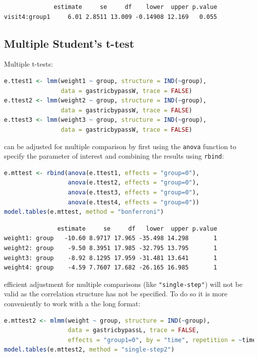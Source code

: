 \documentclass[12pt]{article}
\newcommand\Warning[1][3ex]{%
\renewcommand\stacktype{L}%
\scaleto{\stackon[1.3pt]{\color{red}$\triangle$}{\tiny\bfseries !}}{#1}%
\xspace
}
\begin{document}
\label{}
\begin{verbatim}
              estimate     se     df    lower  upper p.value
visit4:group1     6.01 2.8511 13.009 -0.14908 12.169   0.055
\end{verbatim}


\clearpage
\subsection{Multiple Student's t-test}
\label{sec:orge16a4e0}


Multiple t-tests:
\begin{lstlisting}[language=r,numbers=none]
e.ttest1 <- lmm(weight1 ~ group, structure = IND(~group), 
                data = gastricbypassW, trace = FALSE)
e.ttest2 <- lmm(weight2 ~ group, structure = IND(~group), 
                data = gastricbypassW, trace = FALSE)
e.ttest3 <- lmm(weight3 ~ group, structure = IND(~group), 
                data = gastricbypassW, trace = FALSE)
\end{lstlisting}

can be adjusted for multiple comparison by first using the \texttt{anova}
function to specify the parameter of interest and combining the
results using \texttt{rbind}:
\begin{lstlisting}[language=r,numbers=none]
e.mttest <- rbind(anova(e.ttest1, effects = "group=0"),
                  anova(e.ttest2, effects = "group=0"),
                  anova(e.ttest3, effects = "group=0"),
                  anova(e.ttest4, effects = "group=0"))
model.tables(e.mttest, method = "bonferroni")
\end{lstlisting}

\label{}
\begin{verbatim}
               estimate     se     df   lower  upper p.value
weight1: group   -10.60 8.9717 17.965 -35.498 14.298       1
weight2: group    -9.50 8.3951 17.985 -32.795 13.795       1
weight3: group    -8.92 8.1295 17.959 -31.481 13.641       1
weight4: group    -4.59 7.7607 17.682 -26.165 16.985       1
\end{verbatim}


\Warning efficient adjustment for multiple comparisons (like
\texttt{"single-step"}) will not be valid as the correlation structure has
not be specified. To do so it is more conveniently to work with a the
long format:
\begin{lstlisting}[language=r,numbers=none]
e.mttest2 <- mlmm(weight ~ group, structure = IND(~group),
                  data = gastricbypassL, trace = FALSE,
                  effects = "group1=0", by = "time", repetition = ~time|id)
model.tables(e.mttest2, method = "single-step2")
\end{lstlisting}
\end{document}
